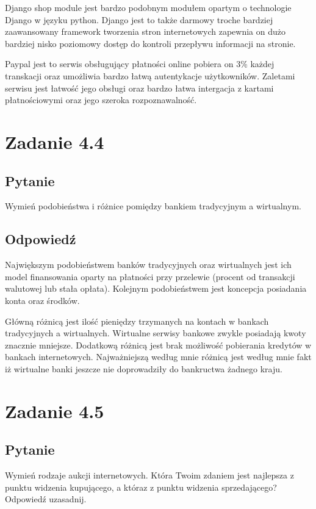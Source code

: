 \documentclass[paper=a4, fontsize=11pt]{scrartcl} %
\numberwithin{equation}{section} %
\numberwithin{figure}{section} %
\numberwithin{table}{section} %
\begin{document}
Django shop module jest bardzo podobnym modułem opartym o technologie Django w języku python.
Django jest to także darmowy troche bardziej zaawansowany framework tworzenia stron internetowych
zapewnia on dużo bardziej nisko poziomowy dostęp do kontroli przepływu informacji na stronie.

Paypal jest to serwis obsługujący płatności online pobiera on 3\% każdej transkacji oraz umożliwia bardzo
łatwą autentykacje użytkowników. Zaletami serwisu jest łatwość jego obsługi oraz bardzo łatwa intergacja
z kartami płatnościowymi oraz jego szeroka rozpoznawalność.


\section{Zadanie 4.4}

\subsection {Pytanie}

Wymień podobieństwa i różnice pomiędzy bankiem tradycyjnym a wirtualnym.

\subsection {Odpowiedź}

Największym podobieństwem banków tradycyjnych oraz wirtualnych jest ich model finansowania
oparty na płatności przy przelewie (procent od transakcji walutowej lub stała opłata).
Kolejnym podobieństwem jest koncepcja posiadania konta oraz środków.

Główną różnicą jest ilość pieniędzy trzymanych na kontach w bankach tradycyjnych a wirtualnych.
Wirtualne serwisy bankowe zwykle posiadają kwoty znacznie mniejsze. Dodatkową różnicą jest 
brak możliwość pobierania kredytów w bankach internetowych. Najważniejszą według mnie różnicą
jest według mnie fakt iż wirtualne banki jeszcze nie doprowadziły do bankructwa żadnego kraju.

\section{Zadanie 4.5}

\subsection {Pytanie}

Wymień rodzaje aukcji internetowych. Która Twoim zdaniem jest najlepsza z punktu widzenia
kupującego, a któraz z punktu widzenia sprzedającego? Odpowiedź uzasadnij.
\end{document}
